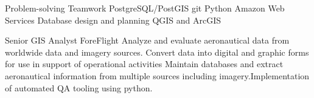 \documentclass[letterpaper]{ReadableCV}
\begin{document}
	






\showHeader





		  {Problem-solving}
		  {Teamwork}
		  {PostgreSQL/PostGIS}
		  {git}
		  {Python}
		  {Amazon Web Services}
		  {Database design and planning}
		  {QGIS and ArcGIS}
		  


{}
{Senior GIS Analyst}
{ForeFlight}
{Analyze and evaluate aeronautical data from worldwide data and imagery sources. Convert data into digital and graphic forms for use in support of operational activities Maintain databases and extract aeronautical information from multiple sources including imagery.Implementation of automated QA tooling using python.}
\end{document}
